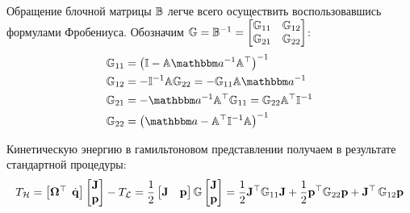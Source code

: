Обращение блочной матрицы $\mathbb{B}$ легче всего осуществить воспользовавшись формулами Фробениуса. Обозначим $\mathbb{G} = \mathbb{B}^{-1} = \begin{bmatrix} \mathbb{G}_{11} & \mathbb{G}_{12} \\ \mathbb{G}_{21} & \mathbb{G}_{22} \end{bmatrix}$:
\vverh
\begin{gather}
	\begin{aligned}
		\bbG_{11} &= \lb \bbI - \bbA \bba^{-1} \bbA^\top \rb^{-1} \\
		\bbG_{12} &= - \bbI^{-1} \bbA \bbG_{22} = - \bbG_{11} \bbA \bba^{-1} \\
		\bbG_{21} &= - \bba^{-1} \bbA^\top \bbG_{11} = \bbG_{22} \bbA^\top \bbI^{-1} \\
		\bbG_{22} &= \lb \bba - \bbA^\top \bbI^{-1} \bbA \rb^{-1}
	\end{aligned} \notag
\end{gather}

Кинетическую энергию в гамильтоновом представлении получаем в результате стандартной процедуры:
\vverh
\begin{gather}
	T_\mH = 
	\begin{bmatrix}
		\mf{\Omega}^\top & \hspace*{-2mm} \dot{\mf{q}}
	\end{bmatrix}
	\begin{bmatrix}
		\mf{J} \\
		\mf{p}
	\end{bmatrix}
	- T_\mL = \frac{1}{2} 
	\begin{bmatrix}
		\mf{J} & \mf{p}
	\end{bmatrix}
	\bbG
	\begin{bmatrix}
		\mf{J} \\
		\mf{p}
	\end{bmatrix} = 
	\frac{1}{2} \mf{J}^\top \bbG_{11} \mf{J} + \frac{1}{2} \mf{p}^\top \bbG_{22} \mf{p} + \mf{J}^\top \, \bbG_{12} \mf{p} \notag
\end{gather}


